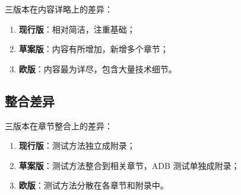 三版本在内容详略上的差异：

\begin{enumerate}[leftmargin=2em]
    \item \textbf{现行版}：相对简洁，注重基础；
    \item \textbf{草案版}：内容有所增加，新增多个章节；
    \item \textbf{欧版}：内容最为详尽，包含大量技术细节。
\end{enumerate}

\subsection{整合差异}

三版本在章节整合上的差异：

\begin{enumerate}[leftmargin=2em]
    \item \textbf{现行版}：测试方法独立成附录；
    \item \textbf{草案版}：测试方法整合到相关章节，ADB 测试单独成附录；
    \item \textbf{欧版}：测试方法分散在各章节和附录中。
\end{enumerate}